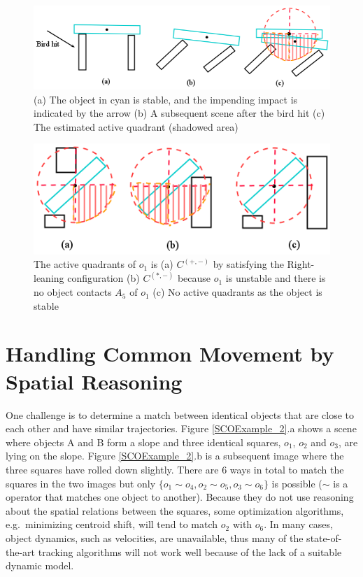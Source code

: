 \documentclass[letterpaper]{article}
\begin{document}
\begin{figure}[h!]
\centering\includegraphics[scale=0.3]{BirdImpact.png}\caption{(a) The object in cyan is stable, and the impending impact is indicated by the arrow (b) A subsequent scene after the bird hit (c) The estimated active quadrant (shadowed area)}
\label{BirdImpact}
\end{figure}

\begin{figure}[h!]
\centering\includegraphics[scale=0.35]{ScenarioByRules.png}\caption{ The active quadrants of $o_1$ is (a)  $C^{(+,-)}$ by satisfying the Right-leaning configuration (b) $C^{(*,-)}$ because $o_1$ is unstable and there is no object contacts $A_5$ of $o_1$ (c) No active quadrants as the object is stable}
\label{ScenarioByRules}
\vspace{-5mm}
\end{figure}

\section{Handling Common Movement by Spatial Reasoning}
\label{CM}

One challenge is to determine a match between identical objects that are close to each other and have similar trajectories. Figure \ref{SCOExample_2}.a  shows a scene where objects A and B form a slope and three identical squares, $o_1$, $o_2$ and $o_3$, are lying on the slope. Figure \ref{SCOExample_2}.b is a subsequent image where the three squares have rolled down slightly. There are 6 ways in total to match the squares in the two images but only $\{o_1 \sim o_4, o_2 \sim o_5, o_3 \sim o_6\}$ is possible ($\sim$ is a operator that matches one object to another). Because they do not use reasoning about the spatial relations between the squares, some optimization algorithms, e.g.\ minimizing centroid shift, will tend to match $o_2$ with $o_6$. In many cases, object dynamics, such as velocities, are unavailable, thus many of the state-of-the-art tracking algorithms will not work well because of the lack of a suitable dynamic model. 
\end{document}
